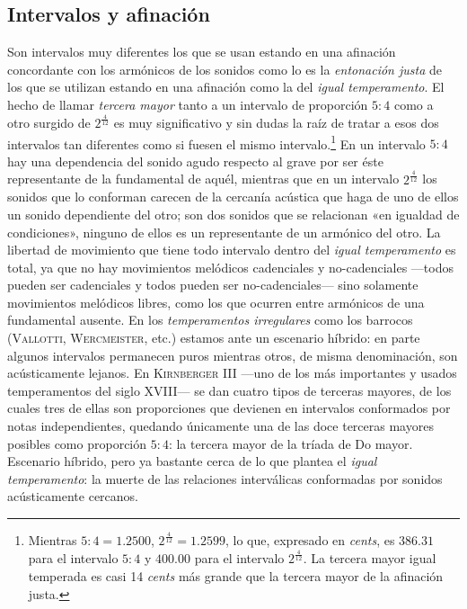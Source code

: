 \documentclass[a4paper,12pt]{article}
\begin{document}
\begin{multicols}{2}
  \section{Intervalos y afinación}\label{sec:intervalos-afinacion}
  Son intervalos muy diferentes los que se usan estando en una afinación concordante con los armónicos de los sonidos como lo es la \emph{entonación justa} de los que se utilizan estando en una afinación como la del \emph{igual temperamento}. El hecho de llamar \emph{tercera mayor} tanto a un intervalo de proporción $5:4$ como a otro surgido de $2^{\frac{4}{12}}$ es muy significativo y sin dudas la raíz de tratar a esos dos intervalos tan diferentes como si fuesen el mismo intervalo.\footnote{Mientras $5:4=1.2500$, $2^{\frac{4}{12}}=1.2599$, lo que, expresado en \emph{cents}, es $386.31$ para el intervalo $5:4$ y $400.00$ para el intervalo $2^{\frac{4}{12}}$. La tercera mayor igual temperada es casi 14 \emph{cents} más grande que la tercera mayor de la afinación justa.} En un intervalo $5:4$ hay una dependencia del sonido agudo respecto al grave por ser éste representante de la fundamental de aquél, mientras que en un intervalo $2^{\frac{4}{12}}$ los sonidos que lo conforman carecen de la cercanía acústica que haga de uno de ellos un sonido dependiente del otro; son dos sonidos que se relacionan «en igualdad de condiciones», ninguno de ellos es un representante de un armónico del otro. La libertad de movimiento que tiene todo intervalo dentro del \emph{igual temperamento} es total, ya que no hay movimientos melódicos cadenciales y no-cadenciales ---todos pueden ser cadenciales y todos pueden ser no-cadenciales--- sino solamente movimientos melódicos libres, como los que ocurren entre armónicos de una fundamental ausente. En los \emph{temperamentos irregulares} como los barrocos (\textsc{Vallotti}, \textsc{Wercmeister}, etc.) estamos ante un escenario híbrido: en parte algunos intervalos permanecen puros mientras otros, de misma denominación, son acústicamente lejanos. En \textsc{Kirnberger III} ---uno de los más importantes y usados temperamentos del siglo XVIII--- se dan cuatro tipos de terceras mayores, de los cuales tres de ellas son proporciones que devienen en intervalos conformados por notas independientes, quedando únicamente una de las doce terceras mayores posibles como proporción $5:4$: la tercera mayor de la tríada de Do mayor. Escenario híbrido, pero ya bastante cerca de lo que plantea el \emph{igual temperamento}: la muerte de las relaciones interválicas conformadas por sonidos acústicamente cercanos.
\end{multicols}
\end{document}
